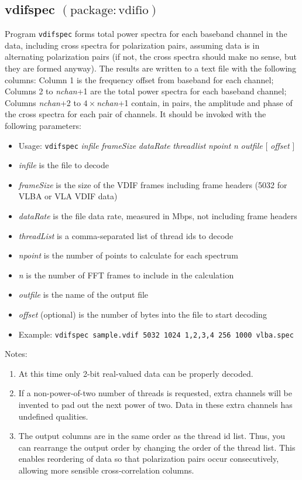 
\subsection{vdifspec {\small $\mathrm{(package: vdifio)}$}} \label{sec:vdifspec}

Program {\tt vdifspec} forms total power spectra for each baseband channel in the data, including cross spectra for polarization pairs, assuming data is in alternating polarization pairs (if not, the cross spectra should make no sense, but they are formed anyway).
The results are written to a text file with the following columns: Column 1 is the frequency offset from baseband for each channel; Columns 2 to {\em nchan}+1 are the total power spectra for each baseband channel; Columns {\em nchan}+2 to $4 \times${\em nchan}+1 contain, in pairs, the amplitude and phase of the cross spectra for each pair of channels.
It should be invoked with the following parameters:

\begin{itemize}
\item[] Usage: {\tt vdifspec} {\em infile} {\em frameSize} {\em dataRate} {\em threadlist} {\em npoint} {\em n} {\em outfile} $[$ {\em offset} $]$ 
\item[] {\em infile} is the file to decode
\item[] {\em frameSize} is the size of the VDIF frames including frame headers (5032 for VLBA or VLA VDIF data)
\item[] {\em dataRate} is the file data rate, measured in Mbps, not including frame headers
\item[] {\em threadList} is a comma-separated list of thread ids to decode
\item[] {\em npoint} is the number of points to calculate for each spectrum
\item[] {\em n} is the number of FFT frames to include in the calculation
\item[] {\em outfile} is the name of the output file
\item[] {\em offset} (optional) is the number of bytes into the file to start decoding
\item[] Example: {\tt vdifspec sample.vdif 5032 1024 1,2,3,4 256 1000 vlba.spec}
\end{itemize}

\noindent
Notes:
\begin{enumerate}
\item At this time only 2-bit real-valued data can be properly decoded.
\item If a non-power-of-two number of threads is requested, extra channels will be invented to pad out the next power of two.
Data in these extra channels has undefined qualities.
\item The output columns are in the same order as the thread id list.
Thus, you can rearrange the output order by changing the order of the thread list.
This enables reordering of data so that polarization pairs occur consecutively, allowing more sensible cross-correlation columns.
\end{enumerate}




